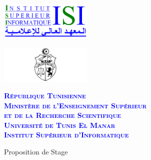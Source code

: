 \documentclass{article}
\begin{document}
\pagestyle{fancy}
\renewcommand{\footrulewidth}{0.4pt}
\renewcommand{\headrulewidth}{0.0pt}
\renewcommand{\baselinestretch}{1}
\lhead{}
\rhead{}

\begin{center}
\begin{minipage}[c]{58mm}
\begin{center}
\includegraphics[width=44mm]{LogoISI}
\end{center}
\end{minipage}
\begin{minipage}[c]{58mm}
\begin{center}
\includegraphics[width=44mm]{Tn2}
\end{center}
\end{minipage}
\begin{minipage}[c]{58mm}
\begin{center}
\textcolor{blue}{
	\footnotesize{
			\textbf{ 
			\textsc{République Tunisienne\\
			Ministère de l'Enseignement Supérieur\\
			et de la Recherche Scientifique\\
			Université de Tunis El Manar\\
			Institut Supérieur d'Informatique\\
			}
		}
	}
}
\end{center}
\end{minipage}
\end{center}

\vspace*{7mm}

\begin{center}
 \huge{Proposition de Stage}
 \end{center}

\vspace*{7mm}
\end{document}
